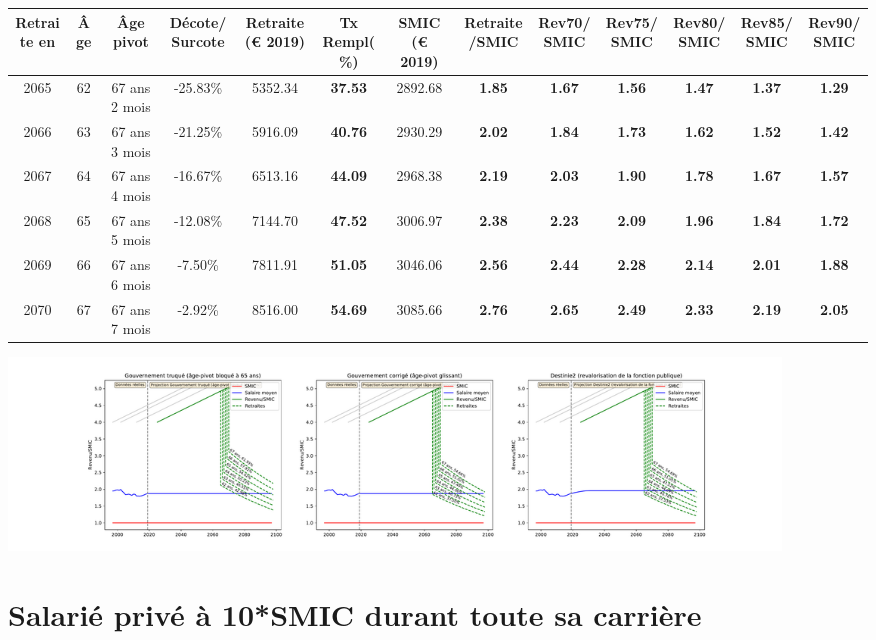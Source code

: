 { \scriptsize \begin{center} 
\begin{tabular}[htb]{|c|c||c|c||c|c||c||c|c|c|c|c|c|} 
\hline 
 Retraite en &  Âge &  Âge pivot &  Décote/Surcote &  Retraite (\euro{} 2019) &  Tx Rempl(\%) &  SMIC (\euro{} 2019) &  Retraite/SMIC &  Rev70/SMIC &  Rev75/SMIC &  Rev80/SMIC &  Rev85/SMIC &  Rev90/SMIC \\ 
\hline \hline 
 2065 &  62 &  67 ans 2 mois &  -25.83\% &  5352.34 &  {\bf 37.53} &  2892.68 &  {\bf 1.85} &  {\bf 1.67} &  {\bf 1.56} &  {\bf 1.47} &  {\bf 1.37} &  {\bf 1.29} \\ 
\hline 
 2066 &  63 &  67 ans 3 mois &  -21.25\% &  5916.09 &  {\bf 40.76} &  2930.29 &  {\bf 2.02} &  {\bf 1.84} &  {\bf 1.73} &  {\bf 1.62} &  {\bf 1.52} &  {\bf 1.42} \\ 
\hline 
 2067 &  64 &  67 ans 4 mois &  -16.67\% &  6513.16 &  {\bf 44.09} &  2968.38 &  {\bf 2.19} &  {\bf 2.03} &  {\bf 1.90} &  {\bf 1.78} &  {\bf 1.67} &  {\bf 1.57} \\ 
\hline 
 2068 &  65 &  67 ans 5 mois &  -12.08\% &  7144.70 &  {\bf 47.52} &  3006.97 &  {\bf 2.38} &  {\bf 2.23} &  {\bf 2.09} &  {\bf 1.96} &  {\bf 1.84} &  {\bf 1.72} \\ 
\hline 
 2069 &  66 &  67 ans 6 mois &  -7.50\% &  7811.91 &  {\bf 51.05} &  3046.06 &  {\bf 2.56} &  {\bf 2.44} &  {\bf 2.28} &  {\bf 2.14} &  {\bf 2.01} &  {\bf 1.88} \\ 
\hline 
 2070 &  67 &  67 ans 7 mois &  -2.92\% &  8516.00 &  {\bf 54.69} &  3085.66 &  {\bf 2.76} &  {\bf 2.65} &  {\bf 2.49} &  {\bf 2.33} &  {\bf 2.19} &  {\bf 2.05} \\ 
\hline 
\hline 
\end{tabular} 
\end{center} } 

 \begin{center}\includegraphics[width=0.9\textwidth]{fig/Ascendant45_2003_22_dest_retraite.pdf}\end{center} \label{fig/Ascendant45_2003_22_dest_retraite.pdf} 

\newpage 
 
\chapter{Salarié privé à 10*SMIC durant toute sa carrière} 


